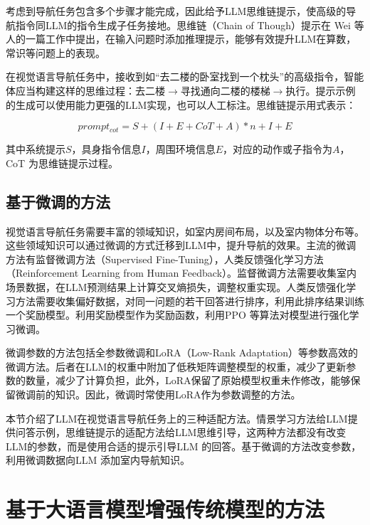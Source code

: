 \documentclass[bachelor]{thesis-uestc}
\begin{document}
考虑到导航任务包含多个步骤才能完成，因此给予LLM思维链提示，使高级的导航指令同LLM的指令生成子任务接地。思维链（Chain of Though）提示在 Wei 等人\cite{weiChainofThoughtPromptingElicits2023}的一篇工作中提出，在输入问题时添加推理提示，能够有效提升LLM在算数，常识等问题上的表现。

在视觉语言导航任务中，接收到如“去二楼的卧室找到一个枕头”的高级指令，智能体应当构建这样的思维过程：去二楼$\rightarrow$寻找通向二楼的楼梯$\rightarrow$执行。提示示例的生成可以使用能力更强的LLM实现，也可以人工标注。思维链提示用式表示：

\begin{equation}
    prompt_{cot} = S+(I+E+CoT+A)*n+I+E
\label{cot}
\end{equation}

其中系统提示$S$，具身指令信息$I$，周围环境信息$E$，对应的动作或子指令为$A$，CoT 为思维链提示过程。

\subsection{基于微调的方法}

视觉语言导航任务需要丰富的领域知识，如室内房间布局，以及室内物体分布等。这些领域知识可以通过微调的方式迁移到LLM中，提升导航的效果。主流的微调方法有监督微调方法（Supervised Fine-Tuning），人类反馈强化学习方法（Reinforcement Learning from Human Feedback）\cite{ouyangTrainingLanguageModels2022}。监督微调方法需要收集室内场景数据，在LLM预测结果上计算交叉熵损失，调整权重实现。人类反馈强化学习方法需要收集偏好数据，对同一问题的若干回答进行排序，利用此排序结果训练一个奖励模型。利用奖励模型作为奖励函数，利用PPO \cite{schulmanProximalPolicyOptimization2017}等算法对模型进行强化学习微调。

微调参数的方法包括全参数微调和LoRA（Low-Rank Adaptation）\cite{huLoRALowRankAdaptation2021}等参数高效的微调方法。后者在LLM的权重中附加了低秩矩阵调整模型的权重，减少了更新参数的数量，减少了计算负担，此外，LoRA保留了原始模型权重未作修改，能够保留微调前的知识。因此，微调时常使用LoRA作为参数调整的方法。

本节介绍了LLM在视觉语言导航任务上的三种适配方法。情景学习方法给LLM提供问答示例，思维链提示的适配方法给LLM思维引导，这两种方法都没有改变LLM的参数，而是使用合适的提示引导LLM 的回答。基于微调的方法改变参数，利用微调数据向LLM 添加室内导航知识。

\section{基于大语言模型增强传统模型的方法}
\end{document}

